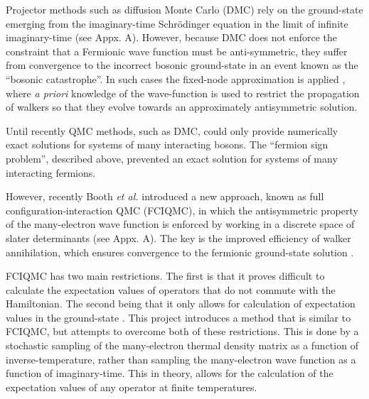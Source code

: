 Projector methods \cite{Kent1999} such as diffusion Monte Carlo (DMC) rely on the ground-state emerging from the imaginary-time Schr\"odinger equation in the limit of infinite imaginary-time (see Appx. A). However, because DMC does not enforce the constraint that a Fermionic wave function must be anti-symmetric, they suffer from convergence to the incorrect bosonic ground-state in an event known as the ``bosonic catastrophe''. In such cases the fixed-node approximation is applied \cite{Foulkes2001,BajdichMichalandMitas2009}, where \textit{a priori} knowledge of the wave-function is used to restrict the propagation of walkers so that they evolve towards an approximately antisymmetric solution.

Until recently QMC methods, such as DMC, could only provide numerically exact solutions for systems of many interacting bosons. The ``fermion sign problem'', described above, prevented an exact solution for systems of many interacting fermions. 

However, recently Booth \textit{et al.} \cite{Booth2009} introduced a new approach, known as full configuration-interaction QMC (FCIQMC), in which the antisymmetric property of the many-electron wave function is enforced by working in a discrete space of slater determinants (see Appx. A). The key is the improved efficiency of walker annihilation, which ensures convergence to the fermionic ground-state solution \cite{Spencer2012}.


FCIQMC has two main restrictions. The first is that it proves difficult to calculate the expectation values of operators that do not commute with the Hamiltonian. The second being that it only allows for calculation of expectation values in the ground-state . This project introduces a method that is similar to FCIQMC, but attempts to overcome both of these restrictions. This is done by a stochastic sampling of the many-electron thermal density matrix as a function of inverse-temperature, rather than sampling the many-electron wave function as a function of imaginary-time. This in theory, allows for the calculation of the expectation values of any operator at finite temperatures.

